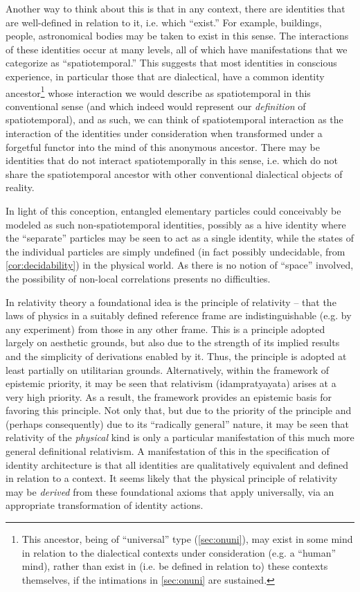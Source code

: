 \documentclass[pra,twocolumn,groupedaddress,10pt]{revtex4}
\theoremstyle{definition}
\begin{document}
Another way to think about this is that in any context, there are identities that are well-defined in relation to it, i.e. which ``exist.'' For example, buildings, people, astronomical bodies may be taken to exist in this sense. The interactions of these identities occur at many levels, all of which have manifestations that we categorize as ``spatiotemporal.'' This suggests that most identities in conscious experience, in particular those that are dialectical, have a common identity ancestor\footnote{This ancestor, being of ``universal'' type (\autoref{sec:onuni}), may exist in some mind in relation to the dialectical contexts under consideration (e.g. a ``human'' mind), rather than exist in (i.e. be defined in relation to) these contexts themselves, if the intimations in \autoref{sec:onuni} are sustained.} whose interaction we would describe as spatiotemporal in this conventional sense (and which indeed would represent our \textit{definition} of spatiotemporal), and as such, we can think of spatiotemporal interaction as the interaction of the identities under consideration when transformed under a forgetful functor into the mind of this anonymous ancestor. There may be identities that do not interact spatiotemporally in this sense, i.e. which do not share the spatiotemporal ancestor with other conventional dialectical objects of reality.

In light of this conception, entangled elementary particles could conceivably be modeled as such non-spatiotemporal identities, possibly as a hive identity where the ``separate'' particles may be seen to act as a single identity, while the states of the individual particles are simply undefined (in fact possibly undecidable, from \autoref{cor:decidability}) in the physical world. As there is no notion of ``space'' involved, the possibility of non-local correlations presents no difficulties.

In relativity theory a foundational idea is the principle of relativity -- that the laws of physics in a suitably defined reference frame are indistinguishable (e.g. by any experiment) from those in any other frame. This is a principle adopted largely on aesthetic grounds, but also due to the strength of its implied results and the simplicity of derivations enabled by it. Thus, the principle is adopted at least partially on utilitarian grounds. Alternatively, within the framework of epistemic priority, it may be seen that relativism (idampratyayata) arises at a very high priority. As a result, the framework provides an epistemic basis for favoring this principle. Not only that, but due to the priority of the principle and (perhaps consequently) due to its ``radically general'' nature, it may be seen that relativity of the \emph{physical} kind is only a particular manifestation of this much more general definitional relativism. A manifestation of this in the specification of identity architecture is that all identities are qualitatively equivalent and defined in relation to a context. It seems likely that the physical principle of relativity may be \emph{derived} from these foundational axioms that apply universally, via an appropriate transformation of identity actions.
\end{document}
